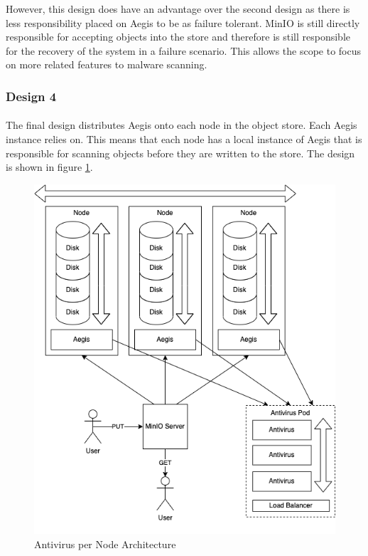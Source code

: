 \documentclass[12pt, conference, final, a4paper, onecolumn, compsoc]{IEEEtran}
\begin{document}
    However, this design does have an advantage over the second design as there is
    less responsibility placed on Aegis to be as failure tolerant. MinIO is
    still directly responsible for accepting objects into the store and
    therefore is still responsible for the recovery of the system in a failure
    scenario. This allows the scope to focus on more related features to malware scanning.

    \subsubsection*{Design 4}
    \paragraph{}

    The final design distributes Aegis onto each node in the object store. Each
    Aegis instance relies on. This means that each node has a local instance of
    Aegis that is responsible for scanning objects before they are written to
    the store. The design is shown in figure \ref{fig:perNodeArch}.

    \begin{figure}
        \centering \includegraphics[scale=.3]{diagrams/per-node.png}
        \caption{Antivirus per Node Architecture}
        \label{fig:perNodeArch}
    \end{figure}
\end{document}
